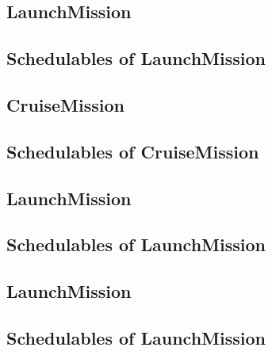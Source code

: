\documentclass[10pt,a4paper]{article}
\begin{document}

\newpage


\subsection{LaunchMission}

\newpage

\subsection{Schedulables of LaunchMission}


\newpage


\subsection{CruiseMission}

\newpage

\subsection{Schedulables of CruiseMission}


\newpage


\newpage


\newpage


\subsection{LaunchMission}

\newpage

\subsection{Schedulables of LaunchMission}


\newpage


\subsection{LaunchMission}

\newpage

\subsection{Schedulables of LaunchMission}
\end{document}
